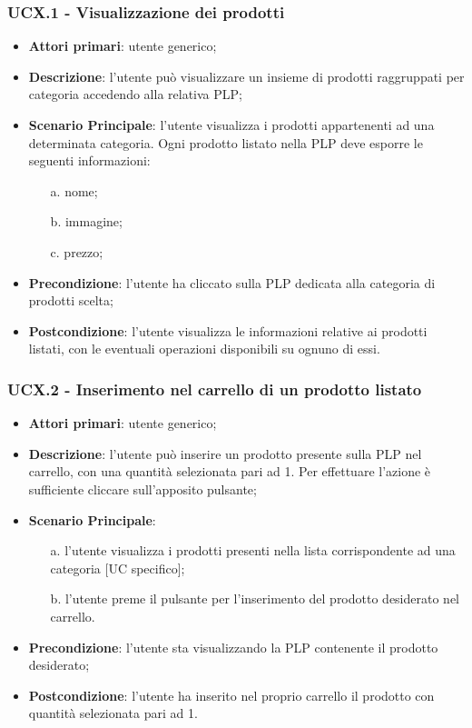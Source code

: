 \subsubsection{UCX.1 - Visualizzazione dei prodotti}
\begin{itemize}
\item \textbf{Attori primari}: utente generico;
\item \textbf{Descrizione}: l'utente può visualizzare un insieme di prodotti raggruppati per categoria accedendo alla relativa PLP;
\item \textbf{Scenario Principale}: l'utente visualizza i prodotti appartenenti ad una determinata categoria. Ogni prodotto listato nella PLP deve esporre le seguenti informazioni:
\begin{enumerate}
\item[a.] nome;
\item[b.] immagine;
\item[c.] prezzo;
\end{enumerate}
\item \textbf{Precondizione}: l'utente ha cliccato sulla PLP dedicata alla categoria di prodotti scelta;
\item \textbf{Postcondizione}: l'utente visualizza le informazioni relative ai prodotti listati, con le eventuali operazioni disponibili su ognuno di essi.
\end{itemize}
\subsubsection{UCX.2 - Inserimento nel carrello di un prodotto listato}
\begin{itemize}
\item \textbf{Attori primari}: utente generico;
\item \textbf{Descrizione}: l'utente può inserire un prodotto presente sulla PLP nel carrello, con una quantità selezionata pari ad 1. Per effettuare l'azione è sufficiente cliccare sull'apposito pulsante;
\item \textbf{Scenario Principale}:
\begin{enumerate}
\item[a.] l'utente visualizza i prodotti presenti nella lista corrispondente ad una categoria [UC specifico];
\item[b.] l'utente preme il pulsante per l'inserimento del prodotto desiderato nel carrello.
\end{enumerate}
\item \textbf{Precondizione}: l'utente sta visualizzando la PLP contenente il prodotto desiderato;
\item \textbf{Postcondizione}: l'utente ha inserito nel proprio carrello il prodotto con quantità selezionata pari ad 1.
\end{itemize}
